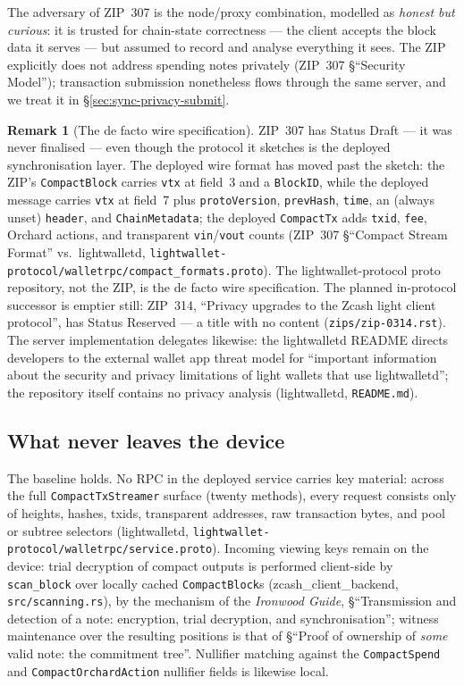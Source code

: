 \documentclass[11pt,a4paper]{article}
\theoremstyle{definition}
\newtheorem{remark}[theorem]{Remark}
\begin{document}
The adversary of ZIP~307 is the node/proxy combination, modelled as
\emph{honest but curious}: it is trusted for chain-state correctness ---
the client accepts the block data it serves --- but assumed to record and
analyse everything it sees. The ZIP explicitly does not address spending
notes privately (ZIP~307 \S``Security Model''); transaction submission
nonetheless flows through the same server, and we treat it in
\S\ref{sec:sync-privacy-submit}.

\begin{remark}[The de facto wire specification]\label{rem:sync-zip307-draft}
ZIP~307 has Status Draft --- it was never finalised --- even though the
protocol it sketches is the deployed synchronisation layer. The deployed
wire format has moved past the sketch: the ZIP's \texttt{CompactBlock}
carries \texttt{vtx} at field~3 and a \texttt{BlockID}, while the deployed
message carries \texttt{vtx} at field~7 plus \texttt{protoVersion},
\texttt{prevHash}, \texttt{time}, an (always unset) \texttt{header}, and
\texttt{ChainMetadata}; the deployed \texttt{CompactTx} adds \texttt{txid},
\texttt{fee}, Orchard actions, and transparent \texttt{vin}/\texttt{vout}
counts (ZIP~307 \S``Compact Stream Format'' vs.\ \textsf{lightwalletd},
\texttt{lightwallet-protocol/walletrpc/compact\_formats.proto}). The
\textsf{lightwallet-protocol} proto repository, not the ZIP, is the de
facto wire specification. The planned in-protocol successor is emptier
still: ZIP~314, ``Privacy upgrades to the Zcash light client protocol'',
has Status Reserved --- a title with no content
(\texttt{zips/zip-0314.rst}). The server implementation delegates likewise:
the \textsf{lightwalletd} README directs developers to the external wallet
app threat model for ``important information about the security and privacy
limitations of light wallets that use lightwalletd''; the repository itself
contains no privacy analysis (\textsf{lightwalletd}, \texttt{README.md}).
\end{remark}

\subsection{What never leaves the device}\label{sec:sync-privacy-local}

The baseline holds. No RPC in the deployed service carries key material:
across the full \texttt{CompactTxStreamer} surface (twenty methods), every
request consists only of heights, hashes, txids, transparent addresses, raw
transaction bytes, and pool or subtree selectors (\textsf{lightwalletd},
\texttt{lightwallet-protocol/walletrpc/service.proto}). Incoming viewing
keys remain on the device: trial decryption of compact outputs is performed
client-side by \texttt{scan\_block} over locally cached
\texttt{CompactBlock}s (\textsf{zcash\_client\_backend},
\texttt{src/scanning.rs}), by the mechanism of the \emph{Ironwood Guide},
\S``Transmission and detection of a note: encryption, trial decryption, and
synchronisation''; witness maintenance over the resulting positions is that
of \S``Proof of ownership of \emph{some} valid note: the commitment tree''.
Nullifier matching against the \texttt{CompactSpend} and
\texttt{CompactOrchardAction} nullifier fields is likewise local.
\end{document}
